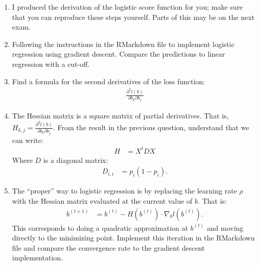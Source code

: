 \documentclass[12pt,hidelinks]{article}
\numberwithin{equation}{section}
\begin{document}
\begin{enumerate}
\item I produced the derivation of the logistic score function for you; make
sure that you can reproduce these steps yourself. Parts of this may be on the
next exam.
\item Following the instructions in the RMarkdown file to implement logistic
regression using gradient descent. Compare the predictions to linear regression
with a cut-off.
\item Find a formula for the second derivatives of the loss function:
\begin{align}
\frac{\partial^2 l(b)}{\partial b_k \partial b_j}
\end{align}
\item The Hessian matrix is a square matrix of partial derivatives. That is,
$H_{k, j} = \frac{\partial^2 l(b)}{\partial b_k \partial b_j}$. From the result
in the previous question, understand that we can write:
\begin{align}
H &= X^t D X
\end{align}
Where $D$ is a diagonal matrix:
\begin{align}
D_{i, i} &= p_i (1 - p_i).
\end{align}
\item The ``proper'' way to logistic regression is by replacing the learning
rate $\rho$ with the Hessian matrix evaluated at the current value of $b$.
That is:
\begin{align}
b^{(t+1)} &= b^{(t)} - H(b^{(t)}) \cdot \nabla_b l(b^{(t)}).
\end{align}
This corresponds to doing a quadratic approximation at $b^{(t)}$ and moving
directly to the minimizing point. Implement this iteration in the RMarkdown
file and compare the convergence rate to the gradient descent implementation.
\end{enumerate}
\end{document}
